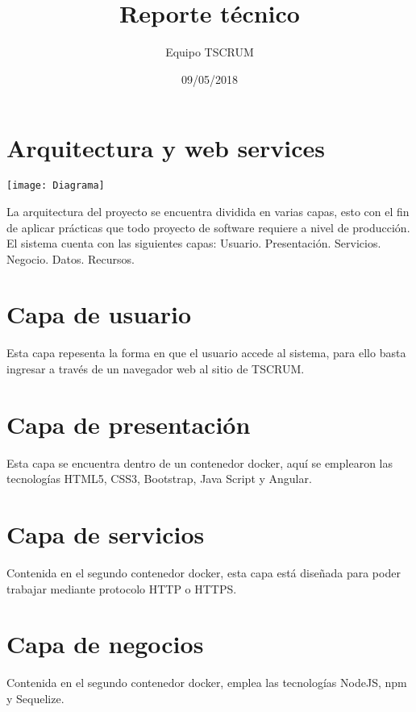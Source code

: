 \documentclass[12pt]{article}
\title {Reporte técnico}
\author{Equipo TSCRUM}
\date{09/05/2018}
\begin{document}
\maketitle

\section{Arquitectura y web services}
\texttt{[image: Diagrama]}



La arquitectura del proyecto se encuentra dividida en varias capas, esto con el fin de aplicar prácticas que todo proyecto de software requiere a nivel de producción. El sistema cuenta con las siguientes capas:
Usuario.
Presentación.
Servicios.
Negocio.
Datos.
Recursos.


\section{Capa de usuario}
Esta capa repesenta la forma en que el usuario accede al sistema, para ello basta ingresar a través de un navegador web al sitio de TSCRUM. \newline\newline

\section{Capa de presentación}
Esta capa se encuentra dentro de un contenedor docker, aquí se emplearon las tecnologías HTML5, CSS3, Bootstrap, Java Script y Angular.\newline\newline

\section{Capa de servicios}
Contenida en el segundo contenedor docker, esta capa está diseñada para poder trabajar mediante protocolo HTTP o HTTPS.\newline\newline

\section{Capa de negocios}
Contenida en el segundo contenedor docker, emplea las tecnologías NodeJS, npm y Sequelize.\newline\newline
\end{document}
